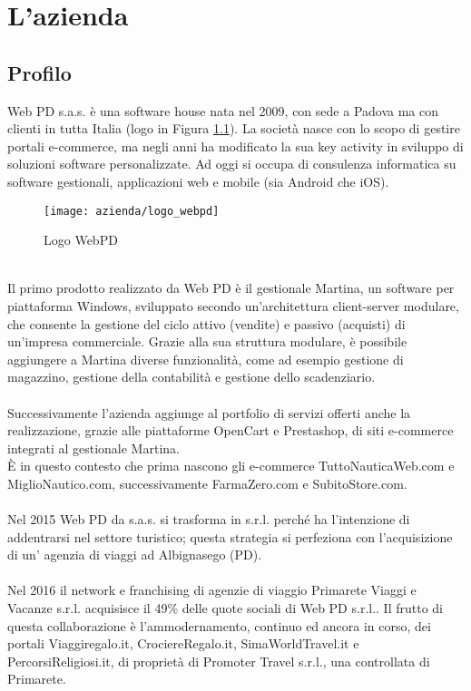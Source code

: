 
\chapter{L'azienda}
\label{cap:processi-metodologie}

\section{Profilo}
Web PD s.a.s. è una software house nata nel 2009, con sede a Padova ma con clienti in tutta Italia (logo in Figura \ref{figura:logo-webpd}). La società nasce con lo scopo di gestire portali e-commerce, ma negli anni ha modificato la sua key activity in sviluppo di soluzioni software personalizzate. Ad oggi si occupa di consulenza informatica su software gestionali, applicazioni web e mobile (sia Android che iOS).\\
\begin{figure}[!h] 
	\centering 
	\texttt{[image: azienda/logo\_webpd]} 
	\caption{Logo WebPD}
	\label{figura:logo-webpd}
\end{figure}
\\
Il primo prodotto realizzato da Web PD è il gestionale Martina, un software per piattaforma Windows, sviluppato secondo un’architettura client-server modulare, che consente la gestione del ciclo attivo (vendite) e passivo (acquisti) di un’impresa commerciale. Grazie alla sua struttura modulare, è possibile aggiungere a Martina diverse funzionalità, come ad esempio gestione di magazzino, gestione della contabilità e
gestione dello scadenziario.\\
\\
Successivamente l’azienda aggiunge al portfolio di servizi offerti anche la realizzazione, grazie alle piattaforme OpenCart e Prestashop, di siti e-commerce integrati al gestionale Martina. \\
È in questo contesto che prima nascono gli e-commerce TuttoNauticaWeb.com e MiglioNautico.com, successivamente FarmaZero.com e SubitoStore.com.\\
\\
Nel 2015 Web PD da s.a.s. si trasforma in s.r.l. perché ha l’intenzione di addentrarsi nel settore turistico; questa strategia si perfeziona con l’acquisizione di un' agenzia di viaggi ad Albignasego (PD).\\
\\
Nel 2016 il network e franchising di agenzie di viaggio Primarete Viaggi e Vacanze s.r.l. acquisisce il 49\% delle quote sociali di Web PD s.r.l.. Il frutto di questa collaborazione è l’ammodernamento, continuo ed ancora in corso, dei portali Viaggiregalo.it, CrociereRegalo.it, SimaWorldTravel.it e PercorsiReligiosi.it, di proprietà di Promoter Travel s.r.l., una controllata di Primarete.\\

